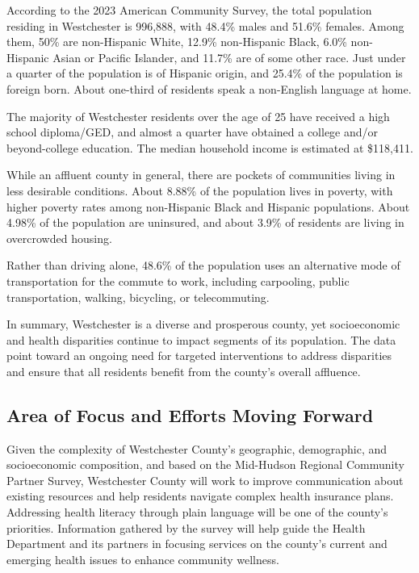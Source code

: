 \documentclass[
  english,
  letterpaper,
]{report}
\begin{document}
According to the 2023 American Community Survey, the total population
residing in Westchester is 996,888, with 48.4\% males and 51.6\%
females. Among them, 50\% are non-Hispanic White, 12.9\% non-Hispanic
Black, 6.0\% non-Hispanic Asian or Pacific Islander, and 11.7\% are of
some other race. Just under a quarter of the population is of Hispanic
origin, and 25.4\% of the population is foreign born. About one-third of
residents speak a non-English language at home.

The majority of Westchester residents over the age of 25 have received a
high school diploma/GED, and almost a quarter have obtained a college
and/or beyond-college education. The median household income is
estimated at \$118,411.

While an affluent county in general, there are pockets of communities
living in less desirable conditions. About 8.88\% of the population
lives in poverty, with higher poverty rates among non-Hispanic Black and
Hispanic populations. About 4.98\% of the population are uninsured, and
about 3.9\% of residents are living in overcrowded housing.

Rather than driving alone, 48.6\% of the population uses an alternative
mode of transportation for the commute to work, including carpooling,
public transportation, walking, bicycling, or telecommuting.

In summary, Westchester is a diverse and prosperous county, yet
socioeconomic and health disparities continue to impact segments of its
population. The data point toward an ongoing need for targeted
interventions to address disparities and ensure that all residents
benefit from the county's overall affluence.

\subsection{Area of Focus and Efforts Moving
Forward}\label{area-of-focus-and-efforts-moving-forward}

Given the complexity of Westchester County's geographic, demographic,
and socioeconomic composition, and based on the Mid-Hudson Regional
Community Partner Survey, Westchester County will work to improve
communication about existing resources and help residents navigate
complex health insurance plans. Addressing health literacy through plain
language will be one of the county's priorities. Information gathered by
the survey will help guide the Health Department and its partners in
focusing services on the county's current and emerging health issues to
enhance community wellness.
\end{document}
